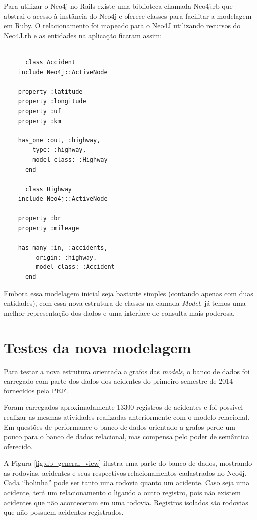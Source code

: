     Para utilizar o Neo4j no Rails existe uma biblioteca chamada Neo4j.rb \footnotemark que abstrai o acesso à instância do Neo4j e
    oferece classes para facilitar a modelagem em Ruby.
    O relacionamento foi mapeado para o Neo4J utilizando recursos do Neo4J.rb e as entidades na aplicação ficaram assim:
    
    
    \lstset{language=Ruby}
    \begin{lstlisting}[frame=single]
    
      class Accident
	include Neo4j::ActiveNode

	property :latitude
	property :longitude
	property :uf
	property :km

	has_one :out, :highway,
		type: :highway,
		model_class: :Highway
      end
      
      class Highway
	include Neo4j::ActiveNode

	property :br
	property :mileage

	has_many :in, :accidents,
		 origin: :highway,
		 model_class: :Accident
      end

    \end{lstlisting}
    
    Embora essa modelagem inicial seja bastante simples (contando apenas com duas entidades),
    com essa nova estrutura de classes na camada \textit{Model}, já temos uma melhor representação
    dos dados e uma interface de consulta mais poderosa.
    
    \vfill
    \pagebreak
    
    \section{Testes da nova modelagem}
    
      Para testar a nova estrutura orientada a grafos das \textit{models}, o banco de dados foi carregado
      com parte dos dados dos acidentes do primeiro semestre de 2014 fornecidos pela PRF.
      
      Foram carregados aproximadamente 13300 registros de acidentes e foi possível realizar as mesmas atividades
      realizadas anteriormente com o modelo relacional. Em questões de performance o banco de dados orientado a 
      grafos perde um pouco para o banco de dados relacional, mas compensa pelo poder de semântica oferecido.
      
      A Figura \ref{fig:db_general_view} ilustra uma parte do banco de dados, mostrando as rodovias, acidentes 
      e seus respectivos relacionamentos cadastrados no Neo4j. Cada ``bolinha'' pode ser tanto uma rodovia quanto
      um acidente. Caso seja uma acidente, terá um relacionamento o ligando a outro registro, pois não existem acidentes
      que não aconteceram em uma rodovia. Registros isolados são rodovias que não possuem acidentes registrados.
      
